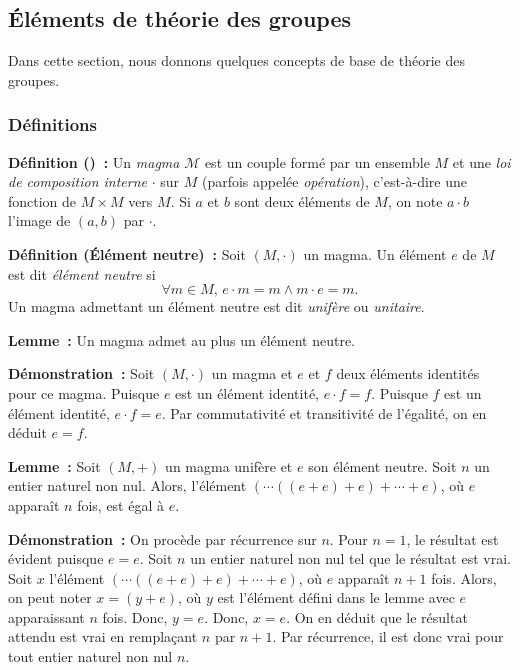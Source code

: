 \subsection{Éléments de théorie des groupes}

Dans cette section, nous donnons quelques concepts de base de théorie des groupes. 

\subsubsection{Définitions}

\noindent\textbf{Définition () :} Un \textit{magma} $\mathcal{M}$ est un couple formé par un ensemble $M$ et une \textit{loi de composition interne} $\cdot$ sur $M$ (parfois appelée \textit{opération}), c'est-à-dire une fonction de $M \times M$ vers $M$. 
    Si $a$ et $b$ sont deux éléments de $M$, on note $a \cdot b$ l'image de $(a,b)$ par $\cdot$.

\medskip

\noindent\textbf{Définition (Élément neutre) :} Soit $(M,\cdot)$ un magma.
    Un élément $e$ de $M$ est dit \textit{élément neutre} si 
    \begin{equation*}
        \forall m \in M, \, e \cdot m = m \wedge m \cdot e = m.
    \end{equation*}
    Un magma admettant un élément neutre est dit \textit{unifère} ou \textit{unitaire}.

\medskip

\noindent\textbf{Lemme :} Un magma admet au plus un élément neutre.

\medskip

\noindent\textbf{Démonstration :} Soit $(M,\cdot)$ un magma et $e$ et $f$ deux éléments identités pour ce magma.
    Puisque $e$ est un élément identité, $e \cdot f = f$.
    Puisque $f$ est un élément identité, $e \cdot f = e$.
    Par commutativité et transitivité de l'égalité, on en déduit $e = f$.

    \hfill \square

\medskip

\noindent\textbf{Lemme :} Soit $(M, +)$ un magma unifère et $e$ son élément neutre.
    Soit $n$ un entier naturel non nul.
    Alors, l'élément $(\cdots ((e + e) + e) + \cdots +e)$, où $e$ apparaît $n$ fois, est égal à $e$.

\medskip

\noindent\textbf{Démonstration :} On procède par récurrence sur $n$. 
    Pour $n = 1$, le résultat est évident puisque $e = e$.
    Soit $n$ un entier naturel non nul tel que le résultat est vrai. 
    Soit $x$ l'élément $(\cdots ((e+e) + e) + \cdots + e)$, où $e$ apparaît $n+1$ fois. 
    Alors, on peut noter $x = (y + e)$, où $y$ est l'élément défini dans le lemme avec $e$ apparaissant $n$ fois. 
    Donc, $y = e$.
    Donc, $x = e$. 
    On en déduit que le résultat attendu est vrai en remplaçant $n$ par $n+1$. 
    Par récurrence, il est donc vrai pour tout entier naturel non nul $n$.

